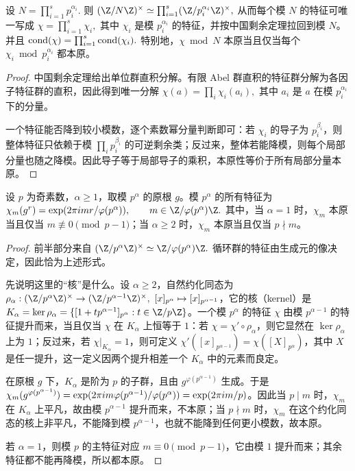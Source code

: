 \begin{theorem}[中国剩余定理下的分解]
设
\(
  N=\prod_{i=1}^s p_i^{\alpha_i}.
\)
则
\(
  \U N\simeq \prod_{i=1}^s \U{p_i^{\alpha_i}},
\)
从而每个模 $N$ 的特征可唯一写成
\(
  \chi=\prod_{i=1}^s\chi_i,
\)
其中 $\chi_i$ 是模 $p_i^{\alpha_i}$ 的特征，并按中国剩余定理拉回到模 $N$。并且
\(
  \operatorname{cond}(\chi)=\prod_{i=1}^s \operatorname{cond}(\chi_i).
\)
特别地，$\chi\bmod N$ 本原当且仅当每个 $\chi_i\bmod p_i^{\alpha_i}$ 都本原。
\end{theorem}

\begin{proof}
中国剩余定理给出单位群直积分解。有限 Abel 群直积的特征群分解为各因子特征群的直积，因此得到唯一分解
\(
  \chi(a)=\prod_i \chi_i(a_i),
\)
其中 $a_i$ 是 $a$ 在模 $p_i^{\alpha_i}$ 下的分量。

一个特征能否降到较小模数，逐个素数幂分量判断即可：若 $\chi_i$ 的导子为 $p_i^{\beta_i}$，则整体特征只依赖于模
\(
  \prod_i p_i^{\beta_i}
\)
的可逆剩余类；反过来，整体若能降模，则每个局部分量也随之降模。因此导子等于局部导子的乘积，本原性等价于所有局部分量本原。
\end{proof}

\begin{theorem}[素数幂模特征的指标表示]
设 $p$ 为奇素数，$\alpha\ge1$，取模 $p^\alpha$ 的原根 $g$。模 $p^\alpha$ 的所有特征为
\(
  \chi_m(g^r)=\expi{mr/\varphi(p^\alpha)},
  \qquad
  m\in\Z/\varphi(p^\alpha)\Z.
\)
其中，当 \(\alpha=1\) 时，\(\chi_m\) 本原当且仅当 \(m\not\equiv0\pmod {p-1}\)；当 \(\alpha\ge2\) 时，\(\chi_m\) 本原当且仅当 \(p\nmid m\)。
\end{theorem}

\begin{proof}
前半部分来自
\(
  \U{p^\alpha}\simeq \Cyc{\varphi(p^\alpha)}.
\)
循环群的特征由生成元的像决定，因此恰为上述形式。

先说明这里的“核”是什么。设 \(\alpha\ge2\)，自然约化同态为
\(\rho_\alpha:\U{p^\alpha}\to\U{p^{\alpha-1}},\ [x]_{p^\alpha}\mapsto [x]_{p^{\alpha-1}}\)，它的核（kernel）是
\(K_\alpha=\ker\rho_\alpha=\{[1+tp^{\alpha-1}]_{p^\alpha}:t\in\Z/p\Z\}\)。一个模 \(p^\alpha\) 的特征 \(\chi\) 由模 \(p^{\alpha-1}\) 的特征提升而来，当且仅当 \(\chi\) 在 \(K_\alpha\) 上恒等于 \(1\)：若 \(\chi=\chi'\circ\rho_\alpha\)，则它显然在 \(\ker\rho_\alpha\) 上为 \(1\)；反过来，若 \(\chi|_{K_\alpha}=1\)，则可定义 \(\chi'([x]_{p^{\alpha-1}})=\chi([X]_{p^\alpha})\)，其中 \(X\) 是任一提升，这一定义因两个提升相差一个 \(K_\alpha\) 中的元素而良定。

在原根 \(g\) 下，\(K_\alpha\) 是阶为 \(p\) 的子群，且由 \(g^{\varphi(p^{\alpha-1})}\) 生成。于是
\(\chi_m(g^{\varphi(p^{\alpha-1})})=\exp(2\pi i m\varphi(p^{\alpha-1})/\varphi(p^\alpha))=\exp(2\pi i m/p)\)。因此当 \(p\mid m\) 时，\(\chi_m\) 在 \(K_\alpha\) 上平凡，故由模 \(p^{\alpha-1}\) 提升而来，不本原；当 \(p\nmid m\) 时，\(\chi_m\) 在这个约化同态的核上非平凡，不能降到模 \(p^{\alpha-1}\)，也就不能降到任何更小模数，故本原。

若 \(\alpha=1\)，则模 \(p\) 的主特征对应 \(m\equiv0\pmod {p-1}\)，它由模 \(1\) 提升而来；其余特征都不能再降模，所以都本原。
\end{proof}

